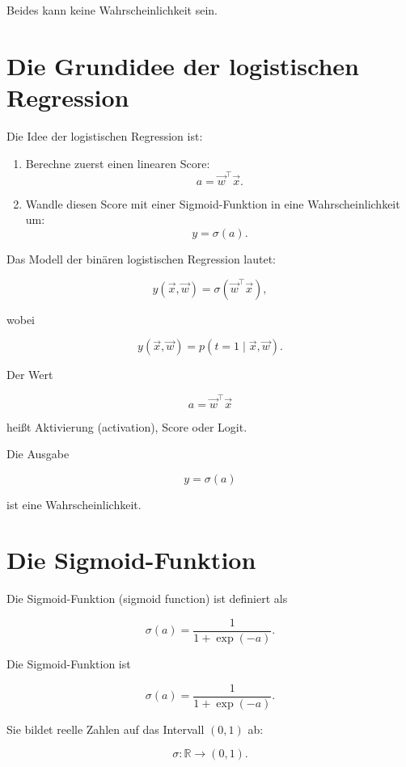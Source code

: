 Beides kann keine Wahrscheinlichkeit sein.

\section{Die Grundidee der logistischen Regression}

Die Idee der logistischen Regression ist:

\begin{enumerate}
    \item Berechne zuerst einen linearen Score:
    \[
        a
        =
        \vec{w}^{\top}\vec{x}.
    \]

    \item Wandle diesen Score mit einer Sigmoid-Funktion in eine Wahrscheinlichkeit um:
    \[
        y
        =
        \sigma(a).
    \]
\end{enumerate}

\begin{definitionbox}
Das Modell der binären logistischen Regression lautet:

\[
    y(\vec{x},\vec{w})
    =
    \sigma(\vec{w}^{\top}\vec{x}),
\]

wobei

\[
    y(\vec{x},\vec{w})
    =
    p(t=1\mid\vec{x},\vec{w}).
\]
\end{definitionbox}

Der Wert

\[
    a
    =
    \vec{w}^{\top}\vec{x}
\]

heißt Aktivierung (activation), Score oder Logit.

Die Ausgabe

\[
    y
    =
    \sigma(a)
\]

ist eine Wahrscheinlichkeit.

\section{Die Sigmoid-Funktion}

Die Sigmoid-Funktion (sigmoid function) ist definiert als

\[
    \sigma(a)
    =
    \frac{1}{1+\exp(-a)}.
\]

\begin{definitionbox}
Die Sigmoid-Funktion ist

\[
    \sigma(a)
    =
    \frac{1}{1+\exp(-a)}.
\]

Sie bildet reelle Zahlen auf das Intervall \((0,1)\) ab:

\[
    \sigma:\mathbb{R}\to(0,1).
\]
\end{definitionbox}

